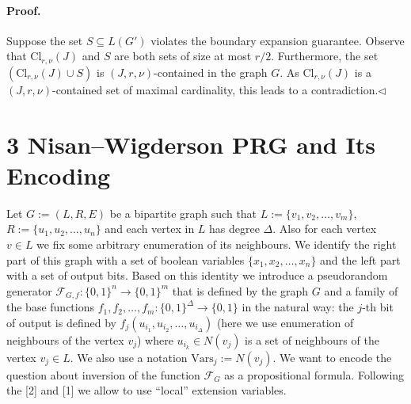 \documentclass[10pt,a4paper]{article}
\begin{document}
\paragraph{Proof.} Suppose the set $S\subseteq L(G')$ violates the boundary expansion guarantee. Observe that $\mathrm{Cl}_{r,\nu}(J)$ and $S$ are both sets of size at most $r/2$. Furthermore, the set $(\mathrm{Cl}_{r,\nu}(J)\cup S)$ is $(J,r,\nu)$-contained in the graph $G$. As $\mathrm{Cl}_{r,\nu}(J)$ is a $(J,r,\nu)$-contained set of maximal cardinality, this leads to a contradiction.\hfill$\triangleleft$
\section*{3 Nisan–Wigderson PRG and Its Encoding}
Let $G:=(L,R,E)$ be a bipartite graph such that $L:=\{v_1,v_2,\ldots,v_m\}$, $R:=\{u_1,u_2,\ldots,u_n\}$ and each vertex in $L$ has degree $\Delta$. Also for each vertex $v\in L$ we fix some arbitrary enumeration of its neighbours. We identify the right part of this graph with a set of boolean variables $\{x_1,x_2,\ldots,x_n\}$ and the left part with a set of output bits. Based on this identity we introduce a pseudorandom generator $\mathcal F_{G,f}:\{0,1\}^n\to\{0,1\}^m$ that is defined by the graph $G$ and a family of the base functions $f_1,f_2,\ldots,f_m:\{0,1\}^\Delta\to\{0,1\}$ in the natural way: the $j$-th bit of output is defined by $f_j(u_{i_1},u_{i_2},\ldots,u_{i_\Delta})$ (here we use enumeration of neighbours of the vertex $v_j$) where $u_{i_k}\in N(v_j)$ is a set of neighbours of the vertex $v_j\in L$. We also use a notation $\mathrm{Vars}_j:=N(v_j)$.
We want to encode the question about inversion of the function $\mathcal F_G$ as a propositional formula. Following the [2] and [1] we allow to use ``local'' extension variables.
\end{document}
